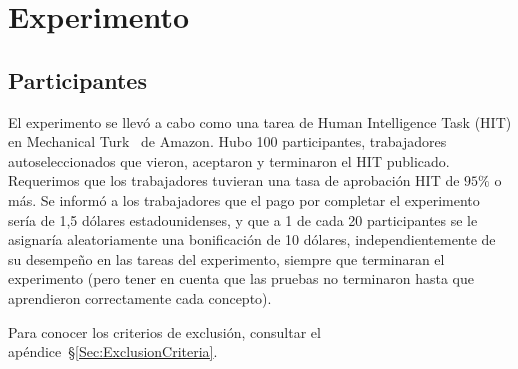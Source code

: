
\section{Experimento}\label{Section:Experiment}

\subsection{Participantes} \label{Participants}

El experimento se llevó a cabo como una tarea de Human Intelligence Task (HIT) en Mechanical Turk~\cite{crump2013evaluating, buhrmester2011amazon, stewart2015average} de Amazon. Hubo 100 participantes, trabajadores autoseleccionados que vieron, aceptaron y terminaron el HIT publicado. Requerimos que los trabajadores tuvieran una tasa de aprobación HIT de $95 \%$ o más. Se informó a los trabajadores que el pago por completar el experimento sería de {1,5} dólares estadounidenses,
y que a 1 de cada 20 participantes se le asignaría aleatoriamente una bonificación de 10 dólares, independientemente de su desempeño en las tareas del experimento, siempre que terminaran el experimento (pero tener en cuenta que las pruebas no terminaron hasta que aprendieron correctamente cada concepto).

Para conocer los criterios de exclusión, consultar el apéndice~\S\ref{Sec:ExclusionCriteria}.


